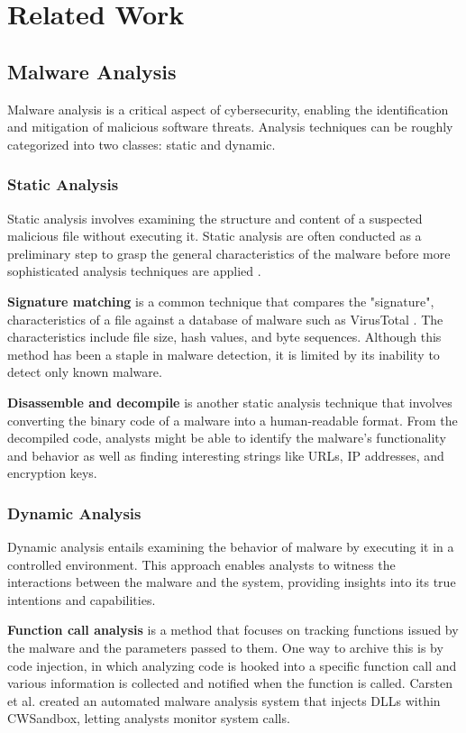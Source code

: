 \section{Related Work}
\subsection{Malware Analysis}
Malware analysis is a critical aspect of cybersecurity, enabling the identification
and mitigation of malicious software threats.
Analysis techniques can be roughly categorized into two classes: static and dynamic.

\subsubsection{Static Analysis}
Static analysis involves examining the structure and content of a suspected malicious file without executing it.
Static analysis are often conducted as a preliminary step to grasp the general characteristics of the malware
before more sophisticated analysis techniques are applied \cite{chakkaravarthy2019survey}.

\textbf{Signature matching} is a common technique that compares the "signature", characteristics of a file
against a database of malware such as VirusTotal \cite{VirusTot28:online}. The characteristics include file size, hash values, and byte sequences.
Although this method has been a staple in malware detection, it is limited by its inability to detect only known malware.

\textbf{Disassemble and decompile} is another static analysis technique
that involves converting the binary code of a malware into a human-readable format.
From the decompiled code, analysts might be able to identify the malware's functionality and behavior as well as finding
interesting strings like URLs, IP addresses, and encryption keys.

\subsubsection{Dynamic Analysis \cite{10.1145/3329786}}
Dynamic analysis entails examining the behavior of malware by executing it in a controlled environment.
This approach enables analysts to witness the interactions between the malware and the system,
providing insights into its true intentions and capabilities.

\textbf{Function call analysis} is a method that focuses on tracking functions issued by the malware and the parameters
passed to them. One way to archive this is by code injection, in which analyzing code is hooked into
a specific function call and various information is collected and notified when the function is called.
Carsten et al. \cite{willems2007toward} created an automated malware analysis system that injects DLLs within CWSandbox,
letting analysts monitor system calls.

